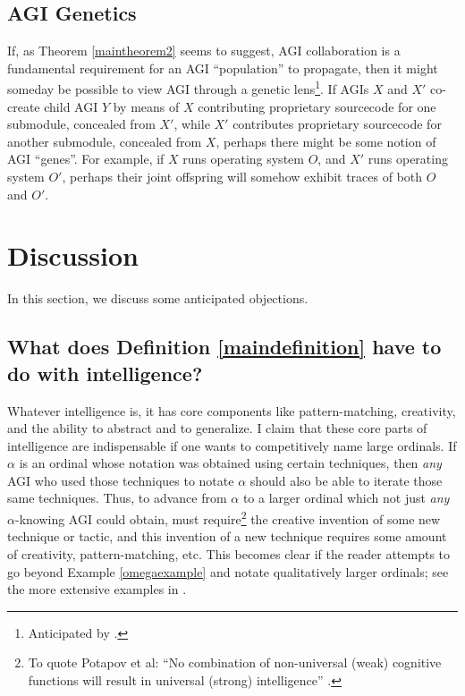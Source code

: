 \documentclass[runningheads]{llncs}
\begin{document}
\subsection{AGI Genetics}

If, as Theorem \ref{maintheorem2} seems to suggest, AGI collaboration
is a fundamental requirement for an AGI ``population'' to propagate, then it might
someday be possible to view AGI through a genetic lens\footnote{Anticipated
by \cite{buchanan1988artificial}.}. If AGIs $X$ and $X'$ co-create child AGI $Y$ by
means of $X$ contributing proprietary sourcecode for one submodule, concealed from $X'$,
while $X'$ contributes proprietary sourcecode for another submodule, concealed from $X$,
perhaps there might be some notion of AGI ``genes''. For example, if $X$ runs operating
system $O$, and $X'$ runs operating system $O'$, perhaps their joint offspring
will somehow exhibit traces of both $O$ and $O'$.


\section{Discussion}
\label{objectionsection}

In this section, we discuss some anticipated objections.

\subsection{What does Definition \ref{maindefinition} have to do with intelligence?}

Whatever intelligence is, it has core components like pattern-matching,
creativity, and the ability to abstract and to generalize.
I claim that these core parts of intelligence are indispensable if one wants to
competitively name large ordinals. If $\alpha$ is an ordinal whose
notation was obtained using certain techniques, then \emph{any} AGI who used those
techniques to notate $\alpha$ should also be able to iterate those same techniques.
Thus, to advance from
$\alpha$ to a larger ordinal which not just \emph{any} $\alpha$-knowing
AGI could obtain, must require\footnote{To quote Potapov et al: ``No combination of
non-universal (weak) cognitive functions will result in universal
(strong) intelligence'' \cite{potapov2012cognitive}.}
the creative invention of some new technique or tactic, and
this invention of a new technique requires some amount of creativity,
pattern-matching, etc. This becomes clear if the reader attempts to
go beyond Example \ref{omegaexample} and notate qualitatively larger ordinals;
see the more extensive examples in \cite{alexander2019measuring}.
\end{document}
